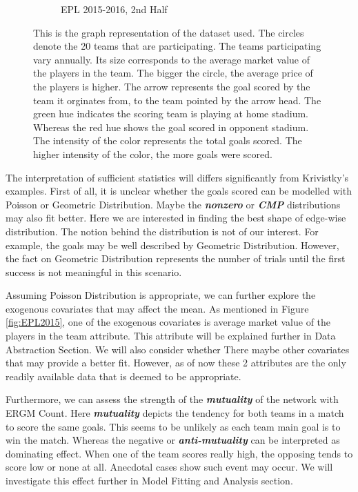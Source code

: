 \documentclass[12pt,a4paper,twoside,openany]{book}\usepackage[]{graphicx}\usepackage[]{color}
\newenvironment{knitrout}{}{} %
\newcommand{\BI}[1]{\textit{\textbf{#1}}}
\begin{document}
\begin{figure}[H]
\begin{subfigure}{0.40\textwidth}
\begin{knitrout}
{}



\end{knitrout}
\caption{EPL 2015-2016, 2nd Half}
\end{subfigure}
\hspace*{\fill}
 
\caption [Graph Representation of a Football League]{This is the graph representation of the dataset used. The circles denote the 20 teams that are participating. The teams participating vary annually. Its size corresponds to the average market value of the players in the team. The bigger the circle, the average price of the players is higher. The arrow represents the goal scored by the team it orginates from, to the team pointed by the arrow head. The green hue indicates the scoring team is playing at home stadium. Whereas the red hue shows the goal scored in opponent stadium. The intensity of the color represents the total goals scored. The higher intensity of the color, the more goals were scored.} \label{fig:1}
\end{figure}

The interpretation of sufficient statistics will differs significantly from Krivistky's examples. 
First of all, it is unclear whether the goals scored can be modelled with Poisson or Geometric Distribution.
Maybe the \BI{nonzero} or \BI{CMP} distributions may also fit better. 
Here we are interested in finding the best shape of edge-wise distribution.
The notion behind the distribution is not of our interest.
For example, the goals may be well described by Geometric Distribution. 
However, the fact on Geometric Distribution represents the number of trials until the first success is not meaningful in this scenario.

Assuming Poisson Distribution is appropriate, we can further explore the exogenous covariates that may affect the mean. 
As mentioned in Figure \ref{fig:EPL2015}, one of the exogenous covariates is average market value of the players in the team attribute. 
This attribute will be explained further in Data Abstraction Section.
We will also consider whether 
There maybe other covariates that may provide a better fit.
However, as of now these 2 attributes are the only readily available data that is deemed to be appropriate.

Furthermore, we can assess the strength of the \BI{mutuality} of the network with ERGM Count.
Here \BI{mutuality} depicts the tendency for both teams in a match to score the same goals.
This seems to be unlikely as each team main goal is to win the match. 
Whereas the negative or \BI{anti-mutuality} can be interpreted as dominating effect.
When one of the team scores really high, the opposing tends to score low or none at all.
Anecdotal cases show such event may occur. 
We will investigate this effect further in Model Fitting and Analysis section.
\end{document}
